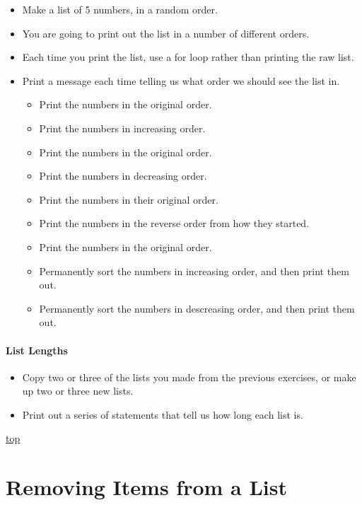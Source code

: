 \documentclass[11pt]{article}
\providecommand{\tightlist}{%
      \setlength{\itemsep}{0pt}\setlength{\parskip}{0pt}}
\begin{document}
\begin{itemize}
\tightlist
\item
  Make a list of 5 numbers, in a random order.
\item
  You are going to print out the list in a number of different orders.
\item
  Each time you print the list, use a for loop rather than printing the
  raw list.
\item
  Print a message each time telling us what order we should see the list
  in.

  \begin{itemize}
  \tightlist
  \item
    Print the numbers in the original order.
  \item
    Print the numbers in increasing order.
  \item
    Print the numbers in the original order.
  \item
    Print the numbers in decreasing order.
  \item
    Print the numbers in their original order.
  \item
    Print the numbers in the reverse order from how they started.
  \item
    Print the numbers in the original order.
  \item
    Permanently sort the numbers in increasing order, and then print
    them out.
  \item
    Permanently sort the numbers in descreasing order, and then print
    them out.
  \end{itemize}
\end{itemize}

\hypertarget{list-lengths}{%
\paragraph{List Lengths}\label{list-lengths}}

\begin{itemize}
\tightlist
\item
  Copy two or three of the lists you made from the previous exercises,
  or make up two or three new lists.
\item
  Print out a series of statements that tell us how long each list is.
\end{itemize}

    \protect\hyperlink{}{top}

    \hypertarget{removing-items-from-a-list}{%
\section{Removing Items from a List}\label{removing-items-from-a-list}}
\end{document}
